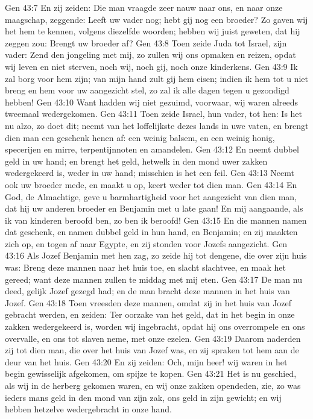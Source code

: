 Gen 43:7  En zij zeiden: Die man vraagde zeer nauw naar ons, en naar onze maagschap, zeggende: Leeft uw vader nog; hebt gij nog een broeder? Zo gaven wij het hem te kennen, volgens diezelfde woorden; hebben wij juist geweten, dat hij zeggen zou: Brengt uw broeder af?
Gen 43:8  Toen zeide Juda tot Israel, zijn vader: Zend den jongeling met mij, zo zullen wij ons opmaken en reizen, opdat wij leven en niet sterven, noch wij, noch gij, noch onze kinderkens.
Gen 43:9  Ik zal borg voor hem zijn; van mijn hand zult gij hem eisen; indien ik hem tot u niet breng en hem voor uw aangezicht stel, zo zal ik alle dagen tegen u gezondigd hebben!
Gen 43:10  Want hadden wij niet gezuimd, voorwaar, wij waren alreeds tweemaal wedergekomen.
Gen 43:11  Toen zeide Israel, hun vader, tot hen: Is het nu alzo, zo doet dit; neemt van het loffelijkste dezes lands in uwe vaten, en brengt dien man een geschenk henen af: een weinig balsem, en een weinig honig, specerijen en mirre, terpentijnnoten en amandelen.
Gen 43:12  En neemt dubbel geld in uw hand; en brengt het geld, hetwelk in den mond uwer zakken wedergekeerd is, weder in uw hand; misschien is het een feil.
Gen 43:13  Neemt ook uw broeder mede, en maakt u op, keert weder tot dien man.
Gen 43:14  En God, de Almachtige, geve u barmhartigheid voor het aangezicht van dien man, dat hij uw anderen broeder en Benjamin met u late gaan! En mij aangaande, als ik van kinderen beroofd ben, zo ben ik beroofd!
Gen 43:15  En die mannen namen dat geschenk, en namen dubbel geld in hun hand, en Benjamin; en zij maakten zich op, en togen af naar Egypte, en zij stonden voor Jozefs aangezicht.
Gen 43:16  Als Jozef Benjamin met hen zag, zo zeide hij tot dengene, die over zijn huis was: Breng deze mannen naar het huis toe, en slacht slachtvee, en maak het gereed; want deze mannen zullen te middag met mij eten.
Gen 43:17  De man nu deed, gelijk Jozef gezegd had; en de man bracht deze mannen in het huis van Jozef.
Gen 43:18  Toen vreesden deze mannen, omdat zij in het huis van Jozef gebracht werden, en zeiden: Ter oorzake van het geld, dat in het begin in onze zakken wedergekeerd is, worden wij ingebracht, opdat hij ons overrompele en ons overvalle, en ons tot slaven neme, met onze ezelen.
Gen 43:19  Daarom naderden zij tot dien man, die over het huis van Jozef was, en zij spraken tot hem aan de deur van het huis.
Gen 43:20  En zij zeiden: Och, mijn heer! wij waren in het begin gewisselijk afgekomen, om spijze te kopen.
Gen 43:21  Het is nu geschied, als wij in de herberg gekomen waren, en wij onze zakken opendeden, zie, zo was ieders mans geld in den mond van zijn zak, ons geld in zijn gewicht; en wij hebben hetzelve wedergebracht in onze hand.
